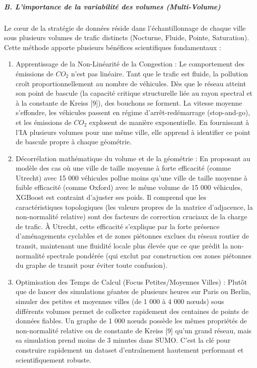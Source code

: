 \documentclass[10pt, a4paper]{article}
\providecommand{\tightlist}{}
\begin{document}
\subparagraph{B. L'importance de la variabilité des volumes
(Multi-Volume)}\label{b.-limportance-de-la-variabilituxe9-des-volumes-multi-volume}

Le cœur de la stratégie de données réside dans l'échantillonnage de
chaque ville sous plusieurs volumes de trafic distincts (Nocturne,
Fluide, Pointe, Saturation). Cette méthode apporte plusieurs bénéfices
scientifiques fondamentaux :

\begin{enumerate}
\def\labelenumi{\arabic{enumi}.}
\tightlist
\item
  Apprentissage de la Non-Linéarité de la Congestion : Le comportement
  des émissions de \(CO_2\) n'est pas linéaire. Tant que le trafic est
  fluide, la pollution croît proportionnellement au nombre de véhicules.
  Dès que le réseau atteint son point de bascule (la capacité critique
  structurelle liée au rayon spectral et à la constante de Kreiss
  {[}9{]}), des bouchons se forment. La vitesse moyenne s'effondre, les
  véhicules passent en régime d'arrêt-redémarrage (stop-and-go), et les
  émissions de \(CO_2\) explosent de manière exponentielle. En
  fournissant à l'IA plusieurs volumes pour une même ville, elle apprend
  à identifier ce point de bascule propre à chaque géométrie.
\item
  Décorrélation mathématique du volume et de la géométrie : En proposant
  au modèle des cas où une ville de taille moyenne à forte efficacité
  (comme Utrecht) avec 15 000 véhicules pollue moins qu'une ville de
  taille moyenne à faible efficacité (comme Oxford) avec le même volume
  de 15 000 véhicules, XGBoost est contraint d'ajuster ses poids. Il
  comprend que les caractéristiques topologiques (les valeurs propres de
  la matrice d'adjacence, la non-normalité relative) sont des facteurs
  de correction cruciaux de la charge de trafic. À Utrecht, cette
  efficacité s'explique par la forte présence d'aménagements cyclables
  et de zones piétonnes exclues du réseau routier de transit, maintenant
  une fluidité locale plus élevée que ce que prédit la non-normalité
  spectrale pondérée (qui exclut par construction ces zones piétonnes du
  graphe de transit pour éviter toute confusion).
\item
  Optimisation des Temps de Calcul (Focus Petites/Moyennes Villes) :
  Plutôt que de lancer des simulations géantes de plusieurs heures sur
  Paris ou Berlin, simuler des petites et moyennes villes (de 1 000 à 4
  000 nœuds) sous différents volumes permet de collecter rapidement des
  centaines de points de données fiables. Un graphe de 1 000 nœuds
  possède les mêmes propriétés de non-normalité relative ou de constante
  de Kreiss {[}9{]} qu'un grand réseau, mais sa simulation prend moins
  de 3 minutes dans SUMO. C'est la clé pour construire rapidement un
  dataset d'entraînement hautement performant et scientifiquement
  robuste.
\end{enumerate}
\end{document}
